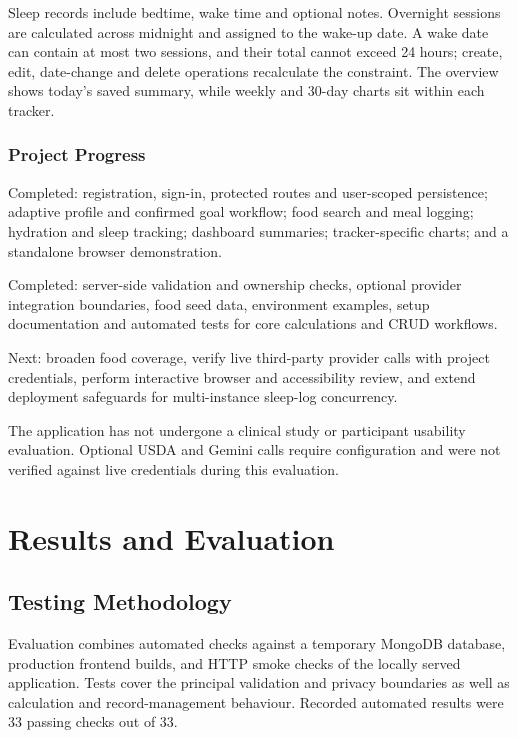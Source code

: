 \documentclass[10pt,a4paper,openany]{report}
\newcommand{\reportchapter}[1]{\chapter{#1}}
\begin{document}
Sleep records include bedtime, wake time and optional notes. Overnight sessions are calculated across midnight and assigned to the wake-up date. A wake date can contain at most two sessions, and their total cannot exceed 24 hours; create, edit, date-change and delete operations recalculate the constraint. The overview shows today's saved summary, while weekly and 30-day charts sit within each tracker.

\subsection{Project Progress}
Completed: registration, sign-in, protected routes and user-scoped persistence; adaptive profile and confirmed goal workflow; food search and meal logging; hydration and sleep tracking; dashboard summaries; tracker-specific charts; and a standalone browser demonstration.

Completed: server-side validation and ownership checks, optional provider integration boundaries, food seed data, environment examples, setup documentation and automated tests for core calculations and CRUD workflows.

Next: broaden food coverage, verify live third-party provider calls with project credentials, perform interactive browser and accessibility review, and extend deployment safeguards for multi-instance sleep-log concurrency.

The application has not undergone a clinical study or participant usability evaluation. Optional USDA and Gemini calls require configuration and were not verified against live credentials during this evaluation.
\clearpage

\reportchapter{Results and Evaluation}
\section{Testing Methodology}
Evaluation combines automated checks against a temporary MongoDB database, production frontend builds, and HTTP smoke checks of the locally served application. Tests cover the principal validation and privacy boundaries as well as calculation and record-management behaviour. Recorded automated results were 33 passing checks out of 33.
\end{document}
